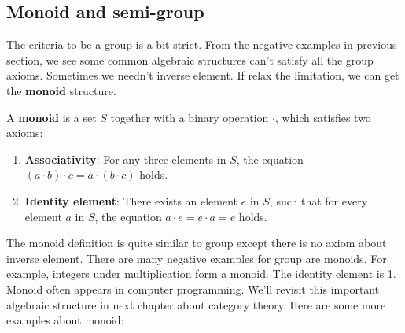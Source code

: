 \documentclass{article}
\begin{document}
\begin{Exercise}
\end{Exercise}

\subsection{Monoid and semi-group}

The criteria to be a group is a bit strict. From the negative examples in previous section, we see some common algebraic structures can't satisfy all the group axioms. Sometimes we needn't inverse element. If relax the limitation, we can get the \textbf{monoid} structure.

\begin{definition}
A \textbf{monoid} is a set $S$ together with a binary operation $\cdot$, which satisfies two axioms:
\begin{enumerate}
\item \textbf{Associativity}: For any three elements in $S$, the equation $(a \cdot b) \cdot c = a \cdot (b \cdot c)$ holds.
\item \textbf{Identity element}: There exists an element $e$ in $S$, such that for every element $a$ in $S$, the equation $a \cdot e = e \cdot a = e$ holds.
\end{enumerate}
\end{definition}

The monoid definition is quite similar to group except there is no axiom about inverse element. There are many negative examples for group are monoids. For example, integers under multiplication form a monoid. The identity element is 1. Monoid often appears in computer programming. We'll revisit this important algebraic structure in next chapter about category theory. Here are some more examples about monoid:
\end{document}
